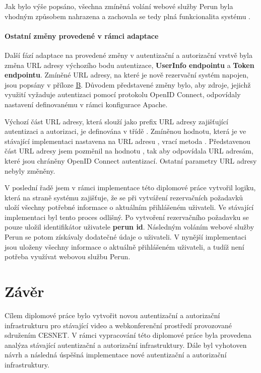 \documentclass[
  printed, %
  twoside, %
  table,   %
  nolof,     %
  nolot,     %
]{fithesis3}
\begin{document}
\par

Jak bylo výše popsáno, všechna zmíněná volání webové služby Perun byla vhodným způsobem nahrazena a zachovala se tedy plná funkcionalita systému .

\subsubsection{Ostatní změny provedené v rámci adaptace}
Další fází adaptace na provedené změny v autentizační a autorizační vrstvě byla změna URL adresy výchozího bodu autentizace, \textbf{UserInfo endpointu} a \textbf{Token endpointu}. Zmíněné URL adresy, na které je nově rezervační systém  napojen, jsou popsány v příloze \hyperref[oidcEndpoints]{B}. Důvodem představené změny bylo, aby zdroje, jejichž využití vyžaduje autentizaci pomocí protokolu OpenID Connect, odpovídaly nastavení definovanému v rámci konfigurace Apache. \par


Výchozí část URL adresy, která slouží jako prefix URL adresy zajišťující autentizaci a autorizaci, je definována v třídě . Zmíněnou hodnotu, která je ve stávající implementaci nastavena na URL adresu , vrací metoda . Představenou část URL adresy jsem pozměnil na hodnotu , tak aby odpovídala URL adresám, které jsou chráněny OpenID Connect autentizací. Ostatní parametry URL adresy nebyly změněny. 
\par

V poslední řadě jsem v rámci implementace této diplomové práce vytvořil logiku, která na straně systému  zajišťuje, že se při vytváření rezervačních požadavků uloží všechny potřebné informace o aktuálním přihlášeném uživateli. Ve stávající implementaci byl tento proces odlišný. Po vytvoření rezervačního požadavku se pouze uložil identifikátor uživatele \textbf{perun id}. Následným voláním webové služby Perun se potom získávaly dodatečné údaje o uživateli. V nynější implementaci jsou uloženy všechny informace o aktuálně přihlášeném uživateli, a tudíž není potřeba využívat webovou službu Perun. 

\chapter{Závěr}
Cílem diplomové práce bylo vytvořit novou autentizační a autorizační infrastrukturu pro stávající video a webkonferenční prostředí provozované sdružením CESNET. V rámci vypracování této diplomové práce byla provedena analýza stávající autentizační a autorizační infrastruktury. Dále byl vyhotoven návrh a následná úspěšná implementace nové autentizační a autorizační infrastruktury.  
\end{document}
